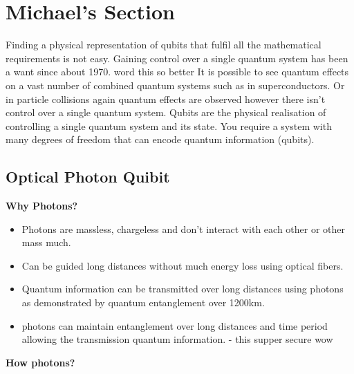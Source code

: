 \section{Michael's Section}
Finding a physical representation of qubits that fulfil all the mathematical requirements is not easy.
Gaining control over a single quantum system has been a want since about 1970. word this so better
It is possible to see quantum effects on a vast number of combined quantum systems such as in superconductors. \cite{nielsen_quantum_2010}
Or in particle collisions again quantum effects are observed however there isn't control over a single quantum system.
Qubits are the physical realisation of controlling a single quantum system and its state.
You require a system with many degrees of freedom that can encode quantum information (qubits). \cite{bergou_quantum_2021}

\subsection{Optical Photon Quibit}

{\bf Why Photons?}
\begin{itemize}
    \item Photons are massless, chargeless and don't interact with each other or other mass much. \cite{nielsen_quantum_2010}
    \item Can be guided long distances without much energy loss using optical fibers. \cite{nielsen_quantum_2010}
    \item Quantum information can be transmitted over long distances using photons as demonstrated by quantum entanglement over 1200km. \cite{yin_satellite-based_2017}
    \item photons can maintain entanglement over long distances and time period allowing the transmission quantum information. - this supper secure wow \cite{thibault_team_nodate}
\end{itemize}

\vspace{1em}
{\bf How photons?}

